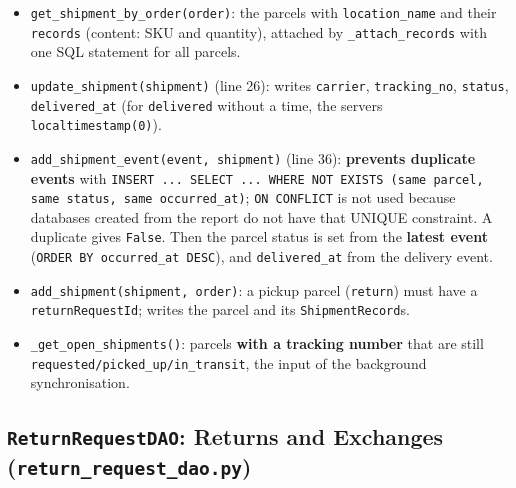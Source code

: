 \begin{itemize}
\tightlist
\item
  \texttt{get\_\allowbreak{}shipment\_\allowbreak{}by\_\allowbreak{}order(\allowbreak{}order)}: the parcels with
  \texttt{location\_\allowbreak{}name} and their \texttt{records} (content: SKU and
  quantity), attached by \texttt{\_\allowbreak{}attach\_\allowbreak{}records} with one SQL
  statement for all parcels.
\item
  \texttt{update\_\allowbreak{}shipment(\allowbreak{}shipment)} (line 26): writes
  \texttt{carrier}, \texttt{tracking\_\allowbreak{}no}, \texttt{status},
  \texttt{delivered\_\allowbreak{}at} (for \texttt{delivered} without a time, the
  server\textquotesingle s \texttt{localtimestamp(\allowbreak{}0)}).
\item
  \texttt{add\_\allowbreak{}shipment\_\allowbreak{}event(\allowbreak{}event,\allowbreak{} shipment)} (line 36):
  \textbf{prevents duplicate events} with
  \texttt{INSERT .\allowbreak{}.\allowbreak{}.\allowbreak{} SELECT .\allowbreak{}.\allowbreak{}.\allowbreak{} WHERE NOT EXISTS (\allowbreak{}same parcel,\allowbreak{} same status,\allowbreak{} same occurred\_\allowbreak{}at)};
  \texttt{ON CONFLICT} is not used because databases created from the
  report do not have that UNIQUE constraint. A duplicate gives
  \texttt{False}. Then the parcel status is set from the \textbf{latest
  event} (\texttt{ORDER BY occurred\_\allowbreak{}at DESC}), and
  \texttt{delivered\_\allowbreak{}at} from the delivery event.
\item
  \texttt{add\_\allowbreak{}shipment(\allowbreak{}shipment,\allowbreak{} order)}: a pickup parcel
  (\texttt{return}) must have a \texttt{returnRequestId}; writes the
  parcel and its \texttt{ShipmentRecord}s.
\item
  \texttt{\_\allowbreak{}get\_\allowbreak{}open\_\allowbreak{}shipments(\allowbreak{})}: parcels \textbf{with a tracking
  number} that are still \texttt{requested/\allowbreak{}picked\_\allowbreak{}up/\allowbreak{}in\_\allowbreak{}transit}, the
  input of the background synchronisation.
\end{itemize}

\hypertarget{returnrequestdao-returns-and-exchanges-return_request_dao.py}{%
\subsection{\texorpdfstring{\texttt{ReturnRequestDAO}: Returns and
Exchanges
(\texttt{return\_\allowbreak{}request\_\allowbreak{}dao.\allowbreak{}py})}{ReturnRequestDAO: Returns and Exchanges (return\_request\_dao.py)}}\label{returnrequestdao-returns-and-exchanges-return_request_dao.py}}

